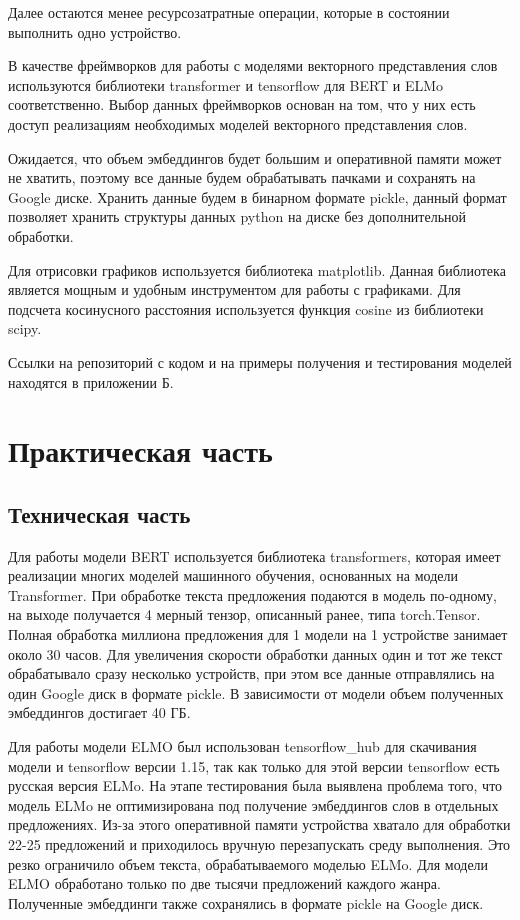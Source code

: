 \documentclass[a4paper,14pt]{article}
\begin{document}
Далее остаются менее ресурсозатратные операции, которые в состоянии выполнить одно устройство.

В качестве фреймворков для работы с моделями векторного представления слов используются библиотеки transformer и tensorflow для BERT и ELMo соответственно.
Выбор данных фреймворков основан на том, что у них есть доступ реализациям необходимых моделей векторного представления слов.

Ожидается, что объем эмбеддингов будет большим и оперативной памяти может не хватить, поэтому все данные будем обрабатывать пачками и сохранять на Google диске.
Хранить данные будем в бинарном формате pickle, данный формат позволяет хранить структуры данных python на диске без дополнительной обработки.

Для отрисовки графиков используется библиотека matplotlib.
Данная библиотека является мощным и удобным инструментом для работы с графиками.
Для подсчета косинусного расстояния используется функция cosine из библиотеки scipy.

Ссылки на репозиторий с кодом и на примеры получения и тестирования моделей находятся в приложении Б.
\newpage
\section{Практическая часть}

\subsection{Техническая часть}

Для работы модели BERT используется библиотека transformers, которая имеет реализации многих моделей машинного обучения, основанных на модели Transformer.
При обработке текста предложения подаются в модель по-одному, на выходе получается 4 мерный тензор, описанный ранее, типа torch.Tensor.
Полная обработка миллиона предложения для 1 модели на 1 устройстве занимает около 30 часов.
Для увеличения скорости обработки данных один и тот же текст обрабатывало сразу несколько устройств, при этом все данные отправлялись на один Google диск в формате pickle.
В зависимости от модели объем полученных эмбеддингов достигает 40 ГБ.

Для работы модели ELMO был использован tensorflow\_hub для скачивания модели и tensorflow версии 1.15, так как только для этой версии tensorflow есть русская версия ELMo.
На этапе тестирования была выявлена проблема того, что модель ELMo не оптимизирована под получение эмбеддингов слов в отдельных предложениях.
Из-за этого оперативной памяти устройства хватало для обработки 22-25 предложений и приходилось вручную перезапускать среду выполнения.
Это резко ограничило объем текста, обрабатываемого моделью ELMo.
Для модели ELMO обработано только по две тысячи предложений каждого жанра.
Полученные эмбеддинги также сохранялись в формате pickle на Google диск.
\end{document}
